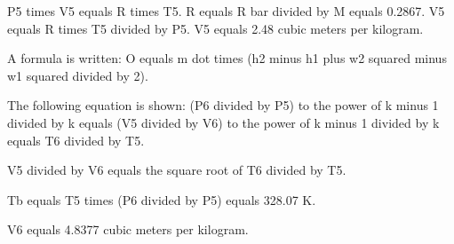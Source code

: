 P5 times V5 equals R times T5.
R equals R bar divided by M equals 0.2867.
V5 equals R times T5 divided by P5.
V5 equals 2.48 cubic meters per kilogram.

A formula is written:
O equals m dot times (h2 minus h1 plus w2 squared minus w1 squared divided by 2).

The following equation is shown:
(P6 divided by P5) to the power of k minus 1 divided by k equals (V5 divided by V6) to the power of k minus 1 divided by k equals T6 divided by T5.

V5 divided by V6 equals the square root of T6 divided by T5.

Tb equals T5 times (P6 divided by P5) equals 328.07 K.

V6 equals 4.8377 cubic meters per kilogram.